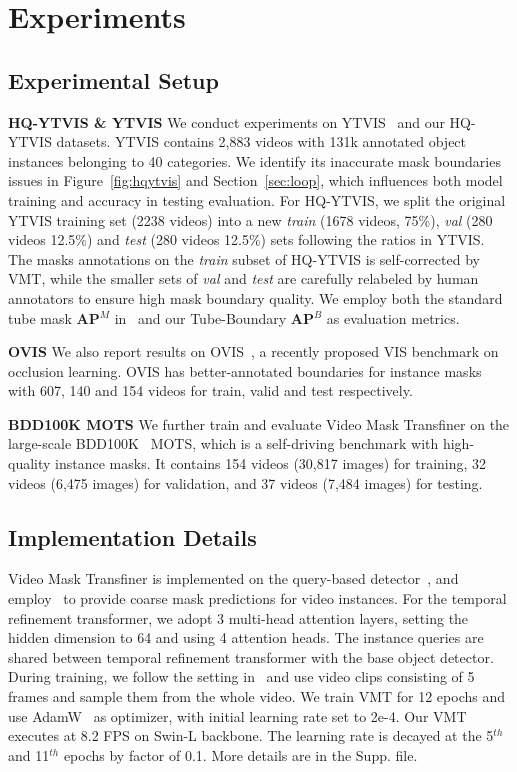 \documentclass[runningheads]{llncs}
\newcommand{\parsection}[1]{\textbf{#1} }
\begin{document}
\section{Experiments}


\subsection{Experimental Setup}


\parsection{HQ-YTVIS \& YTVIS}
We conduct experiments on YTVIS~\cite{yang2019video} and our HQ-YTVIS datasets. YTVIS contains 2,883 videos with 131k annotated object instances belonging to 40 categories. We identify its inaccurate mask boundaries issues in Figure~\ref{fig:hqytvis} and Section~\ref{sec:loop}, which influences both model training and accuracy in testing evaluation.
For HQ-YTVIS, we split the original YTVIS training set (2238 videos) into a new \emph{train} (1678 videos, 75\%), \emph{val} (280 videos 12.5\%) and \emph{test} (280 videos 12.5\%) sets following the ratios in YTVIS. The masks annotations on the \emph{train} subset of HQ-YTVIS is self-corrected by VMT, while the smaller sets of \emph{val} and \emph{test} are carefully relabeled by human annotators to ensure high mask boundary quality. We employ both the standard tube mask \textbf{AP$^M$} in~\cite{yang2019video} and our Tube-Boundary \textbf{AP$^B$} as evaluation metrics. 



\parsection{OVIS} 
We also report results on OVIS~\cite{qi2021occluded}, a recently proposed VIS benchmark on occlusion learning. OVIS has better-annotated boundaries for instance masks with 607, 140 and 154 videos for train, valid and test respectively. 

\parsection{BDD100K MOTS}
We further train and evaluate Video Mask Transfiner on the large-scale BDD100K~\cite{bdd100k} MOTS, which is a self-driving benchmark with high-quality instance masks. It contains 154 videos (30,817 images) for training, 32 videos (6,475 images) for validation, and 37 videos (7,484 images) for testing. 



\subsection{Implementation Details}
Video Mask Transfiner is implemented on the query-based detector~\cite{zhu2020deformable}, and employ~\cite{wu2021seqformer} to provide coarse mask predictions for video instances.
For the temporal refinement transformer, we adopt 3 multi-head attention layers, setting the hidden dimension to 64 and using 4 attention heads. The instance queries are shared between temporal refinement transformer with the base object detector.
During training, we follow the setting in~\cite{wu2021seqformer} and use video clips consisting of 5 frames and sample them from the whole video. We train VMT for 12 epochs and use AdamW~\cite{admw} as optimizer, with initial learning rate set to 2e-4. Our VMT executes at 8.2 FPS on Swin-L backbone. The learning rate is decayed at the 5$^{th}$ and 11$^{th}$ epochs by factor of 0.1. More details are in the Supp. file.
\end{document}
